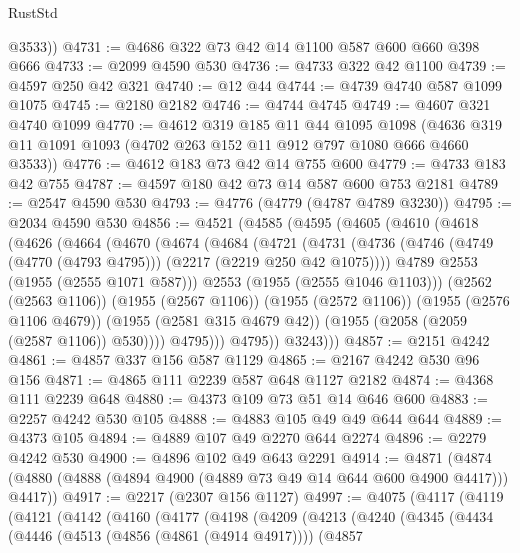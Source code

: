 \begin{lexlean}{RustStd}
\begin{coremodule}
        @3533))
@4731 := @4686 @322 @73 @42 @14 @1100 @587 @600 @660 @398 @666
@4733 := @2099 @4590 @530
@4736 := @4733 @322 @42 @1100
@4739 := @4597 @250 @42 @321
@4740 := @12 @44
@4744 := @4739 @4740 @587 @1099 @1075
@4745 := @2180 @2182
@4746 := @4744 @4745
@4749 := @4607 @321 @4740 @1099
@4770 := @4612
    @319
    @185
    @11
    @44
    @1095
    @1098
    (@4636 @319 @11 @1091 @1093 (@4702 @263 @152 @11 @912 @797 @1080 @666 @4660 @3533))
@4776 := @4612 @183 @73 @42 @14 @755 @600
@4779 := @4733 @183 @42 @755
@4787 := @4597 @180 @42 @73 @14 @587 @600 @753 @2181
@4789 := @2547 @4590 @530
@4793 := @4776 (@4779 (@4787 @4789 @3230))
@4795 := @2034 @4590 @530
@4856 := @4521
    (@4585
      (@4595
        (@4605
          (@4610
            (@4618
              (@4626
                (@4664
                  (@4670
                    (@4674
                      (@4684
                        (@4721
                          (@4731
                            (@4736
                              (@4746 (@4749 (@4770 (@4793 @4795))) (@2217 (@2219 @250 @42 @1075))))
                            @4789
                            @2553
                            (@1955 (@2555 @1071 @587)))
                          @2553
                          (@1955 (@2555 @1046 @1103)))
                        (@2562 (@2563 @1106))
                        (@1955 (@2567 @1106))
                        (@1955 (@2572 @1106))
                        (@1955 (@2576 @1106 @4679))
                        (@1955 (@2581 @315 @4679 @42))
                        (@1955 (@2058 (@2059 (@2587 @1106)) @530))))
                    @4795)))
              @4795))
          @3243)))
@4857 := @2151 @4242
@4861 := @4857 @337 @156 @587 @1129
@4865 := @2167 @4242 @530 @96 @156
@4871 := @4865 @111 @2239 @587 @648 @1127 @2182
@4874 := @4368 @111 @2239 @648
@4880 := @4373 @109 @73 @51 @14 @646 @600
@4883 := @2257 @4242 @530 @105
@4888 := @4883 @105 @49 @49 @644 @644
@4889 := @4373 @105
@4894 := @4889 @107 @49 @2270 @644 @2274
@4896 := @2279 @4242 @530
@4900 := @4896 @102 @49 @643 @2291
@4914 := @4871 (@4874 (@4880 (@4888 (@4894 @4900 (@4889 @73 @49 @14 @644 @600 @4900 @4417))) @4417))
@4917 := @2217 (@2307 @156 @1127)
@4997 := @4075
    (@4117
      (@4119
        (@4121
          (@4142
            (@4160
              (@4177
                (@4198
                  (@4209
                    (@4213
                      (@4240
                        (@4345
                          (@4434
                            (@4446
                              (@4513 (@4856 (@4861 (@4914 @4917))))
                              (@4857

\end{coremodule}
\end{lexlean}
